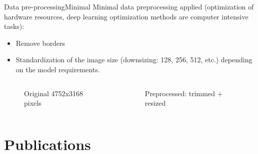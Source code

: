 \documentclass{beamer}
\begin{document}
\begin{frame}{Data pre-processing}{Minimal}
	Minimal data preprocessing applied (optimization of hardware resources, deep learning optimization methods are computer intensive tasks): 
	\begin{itemize}
		\item Remove borders
		\item Standardization of the image size (downsizing: 128, 256, 512, etc.) depending on the model requirements.
	\end{itemize}
	
	\begin{columns}
		\begin{column}{0.5\textwidth}
			\begin{figure}[p]
				\caption{Original 4752x3168 pixels}
			\end{figure}	
		\end{column}
		\begin{column}{0.31\textwidth}  %
			\begin{figure}[p]
				\caption{Preprocessed: trimmed + resized}
			\end{figure}
		\end{column}
	\end{columns}	
\end{frame}

\section{Publications}
\end{document}
